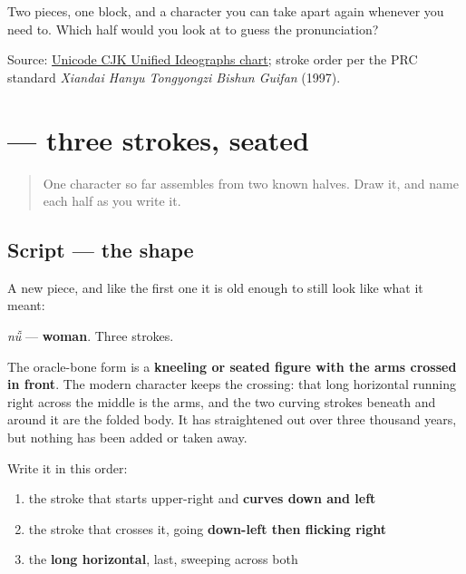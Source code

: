 \begin{tcolorbox}[breakable,colback=teal!4,colframe=teal!35!black,title={Before you move on}]
Two pieces, one block, and a character you can take apart again whenever you need to. Which half would you look at to guess the pronunciation?

Source: \href{https://www.unicode.org/charts/PDF/U4E00.pdf}{Unicode CJK Unified Ideographs chart}; stroke order per the PRC standard \emph{Xiandai Hanyu Tongyongzi Bishun Guifan} (1997).
\end{tcolorbox}
\section[\texorpdfstring{\zh{女} (nǚ)}{女 (nǚ)}]{ — three strokes, seated}

\label{lesson:ZH-W01-nu}



\begin{quote}
One character so far assembles from two known halves. Draw it, and name each half as you write it.
\end{quote}

\subsection*{Script — the shape}

A new piece, and like the first one it is old enough to still look like what it meant:

\begin{quote}
\end{quote}

\textbf{} \emph{nǚ} — \textbf{woman}. Three strokes.

The oracle-bone form is a \textbf{kneeling or seated figure with the arms crossed in front}. The modern character keeps the crossing: that long horizontal running right across the middle is the arms, and the two curving strokes beneath and around it are the folded body. It has straightened out over three thousand years, but nothing has been added or taken away.

Write it in this order:

\begin{enumerate}
\raggedright
  \item the stroke that starts upper-right and \textbf{curves down and left}
  \item the stroke that crosses it, going \textbf{down-left then flicking right}
  \item the \textbf{long horizontal}, last, sweeping across both
\end{enumerate}


